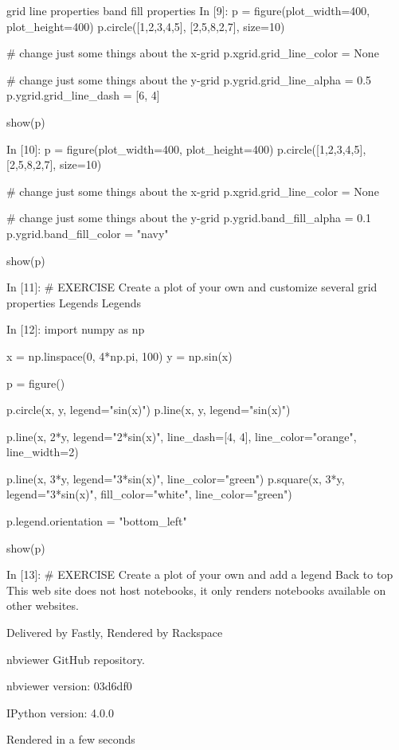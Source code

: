 grid line properties
band fill properties
In [9]:
p = figure(plot_width=400, plot_height=400)
p.circle([1,2,3,4,5], [2,5,8,2,7], size=10)

# change just some things about the x-grid
p.xgrid.grid_line_color = None

# change just some things about the y-grid
p.ygrid.grid_line_alpha = 0.5
p.ygrid.grid_line_dash = [6, 4]

show(p)
	
In [10]:
p = figure(plot_width=400, plot_height=400)
p.circle([1,2,3,4,5], [2,5,8,2,7], size=10)

# change just some things about the x-grid
p.xgrid.grid_line_color = None

# change just some things about the y-grid
p.ygrid.band_fill_alpha = 0.1
p.ygrid.band_fill_color = "navy"

show(p)
	
In [11]:
# EXERCISE Create a plot of your own and customize several grid properties
Legends
Legends

In [12]:
import numpy as np

x = np.linspace(0, 4*np.pi, 100)
y = np.sin(x)

p = figure()

p.circle(x, y, legend="sin(x)")
p.line(x, y, legend="sin(x)")

p.line(x, 2*y, legend="2*sin(x)", line_dash=[4, 4], line_color="orange", line_width=2)

p.line(x, 3*y, legend="3*sin(x)", line_color="green")
p.square(x, 3*y, legend="3*sin(x)", fill_color="white", line_color="green")

p.legend.orientation = "bottom_left"

show(p)
	
In [13]:
# EXERCISE Create a plot of your own and add a legend
Back to top
This web site does not host notebooks, it only renders notebooks available on other websites.

Delivered by Fastly, Rendered by Rackspace

nbviewer GitHub repository.

nbviewer version: 03d6df0

IPython version: 4.0.0

Rendered in a few seconds
